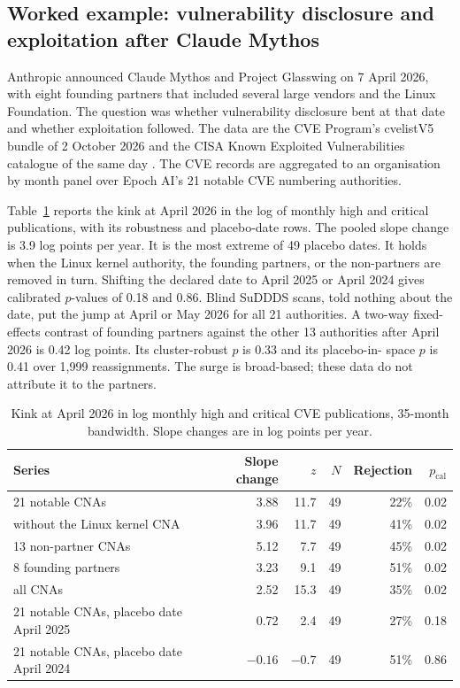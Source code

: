\documentclass[11pt]{article}
\begin{document}
\subsection{Worked example: vulnerability disclosure and exploitation after Claude Mythos}\label{sec:worked}

Anthropic announced Claude Mythos and Project Glasswing on 7 April 2026, with eight
founding partners that included several large vendors and the Linux Foundation. The
question was whether vulnerability disclosure bent at that date and whether exploitation
followed. The data are the CVE Program's cvelistV5 bundle of 2 October 2026 \cite{cvelist} and the
CISA Known Exploited Vulnerabilities catalogue of the same day \cite{kev}. The CVE records
are aggregated to an organisation by month panel over Epoch AI's 21 notable CVE numbering
authorities.

Table~\ref{tab:cve} reports the kink at April 2026 in the log of monthly high and
critical publications, with its robustness and placebo-date rows. The pooled slope
change is 3.9 log points per year. It is the most extreme of 49 placebo dates. It holds when the Linux kernel authority, the
founding partners, or the non-partners are removed in turn. Shifting the declared date to April 2025 or April 2024 gives calibrated
$p$-values of 0.18 and 0.86. Blind SuDDDS scans, told nothing about the date, put the
jump at April or May 2026 for all 21 authorities. A two-way fixed-effects contrast of founding partners against the other 13 authorities
after April 2026 is 0.42 log points. Its cluster-robust $p$ is 0.33 and its placebo-in-
space $p$ is 0.41 over 1{,}999 reassignments. The surge is broad-based; these data do not attribute it to the partners.

\begin{table}[t]
\centering
\small
\caption{Kink at April 2026 in log monthly high and critical CVE publications, 35-month
bandwidth. Slope changes are in log points per year.}
\label{tab:cve}
\begin{tabular}{@{}lrrrrr@{}}
\toprule
Series & Slope change & $z$ & $N$ & Rejection & $p_{\mathrm{cal}}$ \\
\midrule
21 notable CNAs & 3.88 & 11.7 & 49 & 22\% & 0.02 \\
without the Linux kernel CNA & 3.96 & 11.7 & 49 & 41\% & 0.02 \\
13 non-partner CNAs & 5.12 & 7.7 & 49 & 45\% & 0.02 \\
8 founding partners & 3.23 & 9.1 & 49 & 51\% & 0.02 \\
all CNAs & 2.52 & 15.3 & 49 & 35\% & 0.02 \\
21 notable CNAs, placebo date April 2025 & 0.72 & 2.4 & 49 & 27\% & 0.18 \\
21 notable CNAs, placebo date April 2024 & $-0.16$ & $-0.7$ & 49 & 51\% & 0.86 \\
\bottomrule
\end{tabular}
\end{table}
\end{document}
